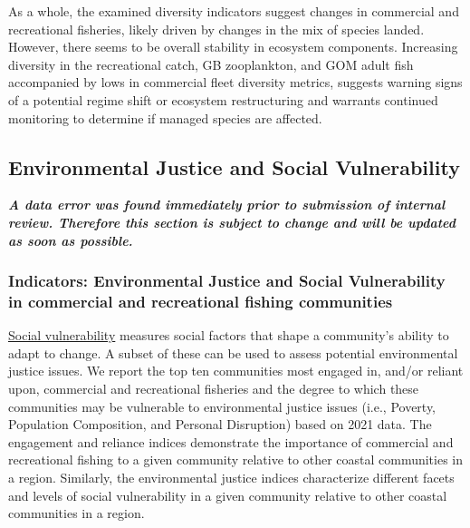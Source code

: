 \documentclass[
  10pt,
]{article}
\begin{document}
As a whole, the examined diversity indicators suggest changes in commercial and recreational fisheries, likely driven by changes in the mix of species landed. However, there seems to be overall stability in ecosystem components. Increasing diversity in the recreational catch, GB zooplankton, and GOM adult fish accompanied by lows in commercial fleet diversity metrics, suggests warning signs of a potential regime shift or ecosystem restructuring and warrants continued monitoring to determine if managed species are affected.

\hypertarget{environmental-justice-and-social-vulnerability}{%
\subsection{Environmental Justice and Social Vulnerability}\label{environmental-justice-and-social-vulnerability}}

\textbf{\emph{A data error was found immediately prior to submission of internal review. Therefore this section is subject to change and will be updated as soon as possible.}}

\hypertarget{indicators-environmental-justice-and-social-vulnerability-in-commercial-and-recreational-fishing-communities}{%
\subsubsection{Indicators: Environmental Justice and Social Vulnerability in commercial and recreational fishing communities}\label{indicators-environmental-justice-and-social-vulnerability-in-commercial-and-recreational-fishing-communities}}

\href{https://noaa-edab.github.io/catalog/engagement-reliance-and-environmental-justice-in-top-fishing-communities.html}{Social vulnerability} measures social factors that shape a community's ability to adapt to change. A subset of these can be used to assess potential environmental justice issues. We report the top ten communities most engaged in, and/or reliant upon, commercial and recreational fisheries and the degree to which these communities may be vulnerable to environmental justice issues (i.e., Poverty, Population Composition, and Personal Disruption) based on 2021 data. The engagement and reliance indices demonstrate the importance of commercial and recreational fishing to a given community relative to other coastal communities in a region. Similarly, the environmental justice indices characterize different facets and levels of social vulnerability in a given community relative to other coastal communities in a region.
\end{document}
